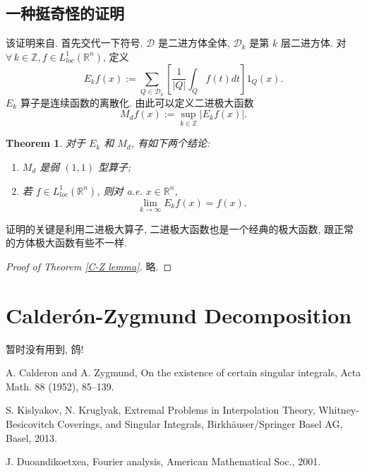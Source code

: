 \documentclass[a4paper,11pt]{article}
\newtheorem{theorem}{Theorem}[section]
\theoremstyle{definition}
\begin{document}
\subsection{一种挺奇怪的证明}

该证明来自\cite[Theorem 2.11]{d01}.
首先交代一下符号. $ \mathcal{D} $ 是二进方体全体, $ \mathcal{D}_k $ 是第 $ k $ 层二进方体. 
对 $ \forall \, k \in \mathbb{Z}, f \in L^1_{loc}(\mathbb{R}^n) $, 定义
$$
    E_k f (x) := \sum_{Q \in \mathcal{D}_k} \left[ \frac{1}{|Q|} \int_{Q} f(t) dt \right] \mathrm{1}_Q (x).
$$
$ E_k $ 算子是连续函数的离散化. 由此可以定义二进极大函数
$$
    M_d f(x) := \sup_{k \in \mathbb{Z}} |E_k f (x)|.
$$

\begin{theorem} \label{thm} 
    对于 $ E_k $ 和 $ M_d $, 有如下两个结论:
    \begin{enumerate}[{\rm(i)}]
        \item $ M_d $ 是弱 $ (1, 1) $ 型算子;
        \item 若 $ f \in L^1_{loc}(\mathbb{R}^n) $, 则对 a.e. $ x \in \mathbb{R}^n $,
        $$
            \lim_{k \to \infty} E_k f (x) = f(x).
        $$
    \end{enumerate}
\end{theorem}

证明的关键是利用二进极大算子, 二进极大函数也是一个经典的极大函数, 跟正常的方体极大函数有些不一样.

\begin{proof}[Proof of Theorem \ref{C-Z lemma}]
    略.
\end{proof}

\section{Calder\'on-Zygmund Decomposition}

暂时没有用到, 鸽!

\begin{thebibliography}{99}

     A. Calderon and A. Zygmund, On the existence of certain singular integrals, 
        Acta Math. 88 (1952), 85--139.
        
     S. Kislyakov, N. Kruglyak,
    Extremal Problems in Interpolation Theory, Whitney-Besicovitch Coverings, and Singular Integrals,
    Birkh\"{a}user/Springer Basel AG, Basel, 2013.
    
     J. Duoandikoetxea, Fourier analysis, American Mathematical Soc., 2001.
    
\end{thebibliography}
\end{document}
